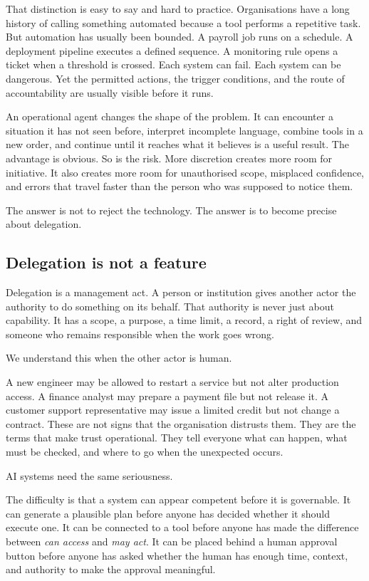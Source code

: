That distinction is easy to say and hard to practice. Organisations have
a long history of calling something automated because a tool performs a
repetitive task. But automation has usually been bounded. A payroll job
runs on a schedule. A deployment pipeline executes a defined sequence. A
monitoring rule opens a ticket when a threshold is crossed. Each system
can fail. Each system can be dangerous. Yet the permitted actions, the
trigger conditions, and the route of accountability are usually visible
before it runs.

An operational agent changes the shape of the problem. It can encounter
a situation it has not seen before, interpret incomplete language,
combine tools in a new order, and continue until it reaches what it
believes is a useful result. The advantage is obvious. So is the risk.
More discretion creates more room for initiative. It also creates more
room for unauthorised scope, misplaced confidence, and errors that
travel faster than the person who was supposed to notice them.

The answer is not to reject the technology. The answer is to become
precise about delegation.

\subsection{Delegation is not a
feature}\label{delegation-is-not-a-feature}

Delegation is a management act. A person or institution gives another
actor the authority to do something on its behalf. That authority is
never just about capability. It has a scope, a purpose, a time limit, a
record, a right of review, and someone who remains responsible when the
work goes wrong.

We understand this when the other actor is human.

A new engineer may be allowed to restart a service but not alter
production access. A finance analyst may prepare a payment file but not
release it. A customer support representative may issue a limited credit
but not change a contract. These are not signs that the organisation
distrusts them. They are the terms that make trust operational. They
tell everyone what can happen, what must be checked, and where to go
when the unexpected occurs.

AI systems need the same seriousness.

The difficulty is that a system can appear competent before it is
governable. It can generate a plausible plan before anyone has decided
whether it should execute one. It can be connected to a tool before
anyone has made the difference between \emph{can access} and \emph{may
act}. It can be placed behind a human approval button before anyone has
asked whether the human has enough time, context, and authority to make
the approval meaningful.

